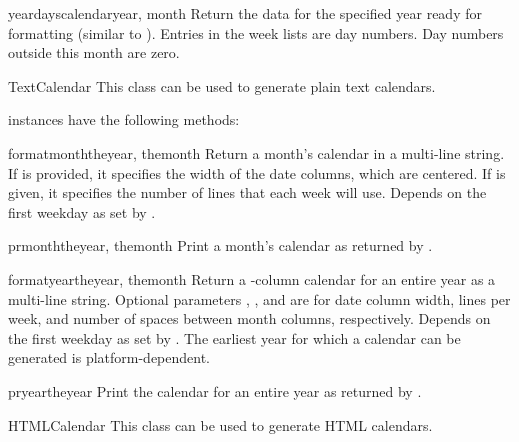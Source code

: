 \begin{methoddesc}{yeardayscalendar}{year, month}
Return the data for the specified year ready for formatting (similar to
). Entries in the week lists are day numbers.
Day numbers outside this month are zero.
\end{methoddesc}


\begin{classdesc}{TextCalendar}{}
This class can be used to generate plain text calendars.

\end{classdesc}

 instances have the following methods:

\begin{methoddesc}{formatmonth}{theyear, themonth}
Return a month's calendar in a multi-line string. If  is
provided, it specifies the width of the date columns, which are
centered. If  is given, it specifies the number of lines that
each week will use. Depends on the first weekday as set by
.
\end{methoddesc}

\begin{methoddesc}{prmonth}{theyear, themonth}
Print a month's calendar as returned by .
\end{methoddesc}

\begin{methoddesc}{formatyear}{theyear, themonth}
Return a -column calendar for an entire year as a multi-line string.
Optional parameters , , and  are for date column
width, lines per week, and number of spaces between month columns,
respectively. Depends on the first weekday as set by
.  The earliest year for which a calendar can
be generated is platform-dependent.
\end{methoddesc}

\begin{methoddesc}{pryear}{theyear}
Print the calendar for an entire year as returned by .
\end{methoddesc}


\begin{classdesc}{HTMLCalendar}{}
This class can be used to generate HTML calendars.

\end{classdesc}

